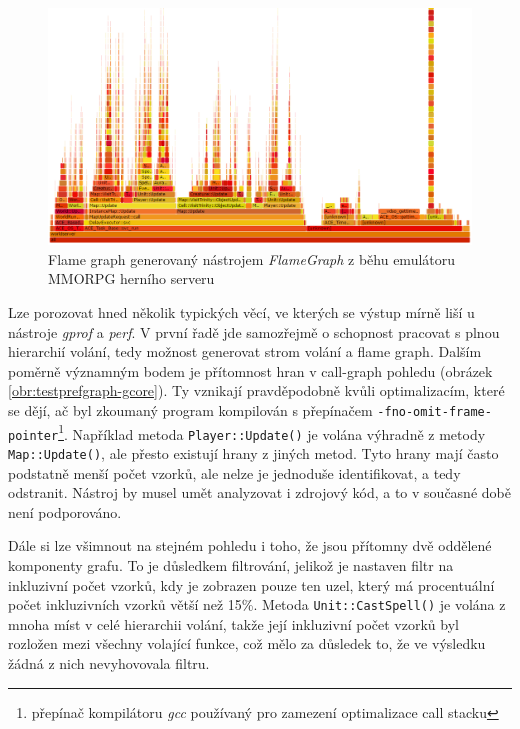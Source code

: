 \documentclass[czech,BP]{thesiskiv}
\begin{document}
\begin{figure}
    \centering
    \includegraphics[interpolate,width=1.0\textwidth]{img/test-gcore-brendan-flame.png}
    \caption{Flame graph generovaný nástrojem \emph{FlameGraph} z běhu emulátoru MMORPG herního serveru}
    \label{obr:testprefflamegregg-gcore}
\end{figure}

Lze porozovat hned několik typických věcí, ve kterých se výstup mírně liší u nástroje \emph{gprof} a \emph{perf}. V první řadě jde samozřejmě o schopnost pracovat s plnou hierarchií volání, tedy možnost generovat strom volání a flame graph. Dalším poměrně významným bodem je přítomnost  hran v call-graph pohledu (obrázek \ref{obr:testprefgraph-gcore}). Ty vznikají pravděpodobně kvůli optimalizacím, které se dějí, ač byl zkoumaný program kompilován s přepínačem \texttt{-fno-omit-frame-pointer}\footnote{přepínač kompilátoru \emph{gcc} používaný pro zamezení optimalizace call stacku}. Například metoda \texttt{Player::Update()} je volána výhradně z metody \texttt{Map::Update()}, ale přesto existují hrany z jiných metod. Tyto hrany mají často podstatně menší počet vzorků, ale nelze je jednoduše identifikovat, a tedy odstranit. Nástroj by musel umět analyzovat i zdrojový kód, a to v současné době není podporováno.

Dále si lze všimnout na stejném pohledu i toho, že jsou přítomny dvě oddělené komponenty grafu. To je důsledkem filtrování, jelikož je nastaven filtr na inkluzivní počet vzorků, kdy je zobrazen pouze ten uzel, který má procentuální počet inkluzivních vzorků větší než 15\%. Metoda \texttt{Unit::CastSpell()} je volána z mnoha míst v celé hierarchii volání, takže její inkluzivní počet vzorků byl rozložen mezi všechny volající funkce, což mělo za důsledek to, že ve výsledku žádná z nich nevyhovovala filtru.
\end{document}
